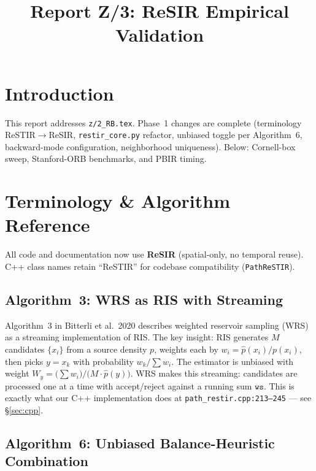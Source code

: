 
\title{Report Z/3: ReSIR Empirical Validation}

\maketitle

\section{Introduction}

This report addresses \texttt{z/2\_RB.tex}. Phase~1 changes are complete
(terminology ReSTIR$\to$ReSIR, \texttt{restir\_core.py} refactor, unbiased
toggle per Algorithm~6, backward-mode configuration, neighborhood uniqueness).
Below: Cornell-box sweep, Stanford-ORB benchmarks, and PBIR timing.

\section{Terminology \& Algorithm Reference}

All code and documentation now use \textbf{ReSIR} (spatial-only, no
temporal reuse). C++ class names retain ``ReSTIR'' for codebase
compatibility (\texttt{PathReSTIR}).

\subsection{Algorithm~3: WRS as RIS with Streaming}

Algorithm~3 in Bitterli et al.\ 2020 describes weighted reservoir sampling
(WRS) as a streaming implementation of RIS. The key insight: RIS generates $M$
candidates $\{x_i\}$ from a source density $p$, weights each by $w_i =
\hat{p}(x_i)/p(x_i)$, then picks $y=x_k$ with probability $w_k / \sum w_i$.
The estimator is unbiased with weight $W_y = \bigl(\sum w_i\bigr) /
\bigl(M \cdot \hat{p}(y)\bigr)$. WRS makes this streaming: candidates are
processed one at a time with accept/reject against a running sum $\texttt{ws}$.
This is exactly what our C++ implementation does at
\texttt{path\_restir.cpp:213--245} --- see \S\ref{sec:cpp}.

\subsection{Algorithm~6: Unbiased Balance-Heuristic Combination}


